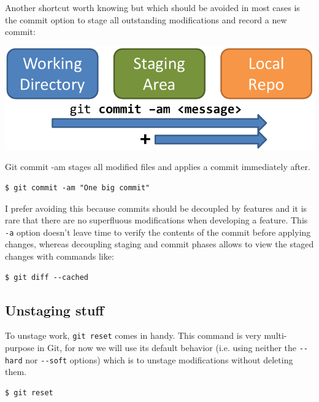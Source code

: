 \documentclass[a4paper]{../../common/tufte-latex/tufte-handout}
\begin{document}
Another shortcut worth knowing but which should be avoided in most cases is the commit option to stage all outstanding modifications and record a new commit:
\begin{marginfigure}%
  \centering
  \includegraphics[width=\linewidth]{gitcommit-am-schema.pdf}
  \label{fig:gitcommit-am}
  \caption{Git commit -am stages all modified files and applies a commit immediately after.}
\end{marginfigure}
\begin{lstlisting}[style=BashInputStyle]
  $ git commit -am "One big commit"
\end{lstlisting}

I prefer avoiding this because commits should be decoupled by features and it is rare that there are no superfluous modifications when developing a feature.
This \texttt{-a} option doesn't leave time to verify the contents of the commit before applying changes, whereas decoupling staging and commit phases allows to view the staged changes with commands like:

\begin{lstlisting}[style=BashInputStyle]
  $ git diff --cached
\end{lstlisting}

\subsection{Unstaging stuff}

To unstage work, \texttt{git reset} comes in handy.
This command is very multi-purpose in Git, for now we will use its default behavior (i.e. using neither the \texttt{-{}-hard} nor \texttt{-{}-soft} options) which is to unstage modifications without deleting them.

\begin{lstlisting}[style=BashInputStyle]
  $ git reset 
\end{lstlisting}
\end{document}

